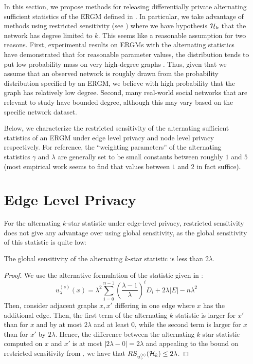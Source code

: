 In this section, we propose methods for releasing differentially private alternating sufficient statistics of the ERGM defined in . In particular, we take advantage of methods using restricted sensitivity (see ) where we have hypothesis $\mathcal{H}_k$ that the network has degree limited to $k$. This seems like a reasonable assumption for two reasons. First, experimental results on ERGMs with the alternating statistics have demonstrated that for reasonable parameter values, the distribution tends to put low probability mass on very high-degree graphs \cite{Sni+06}. Thus, given that we assume that an observed network is roughly drawn from the probability distribution specified by an ERGM, we believe with high probability that the graph has relatively low degree. Second, many real-world social networks that are relevant to study have bounded degree, although this may vary based on the specific network dataset. 

Below, we characterize the restricted sensitivity of the alternating sufficient statistics of an ERGM under edge level privacy and node level privacy respectively. For reference, the ``weighting parameters'' of the alternating statistics $\gamma$ and $\lambda$ are generally set to be small constants between roughly $1$ and $5$ (most empirical work seems to find that values between $1$ and $2$ in fact suffice).

\section{Edge Level Privacy} 

For the alternating $k$-star statistic under edge-level privacy, restricted sensitivity does not
give any advantage over using global sensitivity, as the global sensitivity of this statistic is quite low:

\begin{claim}
The global sensitivity of the alternating $k$-star statistic is less than $2\lambda$. 
\end{claim}
\begin{proof}
We use the alternative formulation of the statistic given in :
$$u_\lambda^{(s)}(x) =  \lambda^2 \sum_{i = 0}^{n-1} \left(\frac{\lambda - 1}{\lambda}\right)^i D_i + 2 \lambda |E| - n \lambda^2$$
Then, consider adjacent graphs $x, x'$ differing in one edge where $x$ has the additional edge. Then, the first term of the alternating $k$-statistic is larger for $x'$ than for $x$ and by at most $2\lambda$ and at least $0$, while the second term is larger for $x$ than for $x'$ by $2\lambda$. Hence, the difference between the alternating $k$-star statistic computed on $x$ and $x'$ is at most $|2\lambda - 0| = 2\lambda$ and appealing to the bound on restricted sensitivity from , we have that $RS_{u_\gamma^{(t)}} (\mathcal{H}_k) \leq 2\lambda$.
\end{proof}

